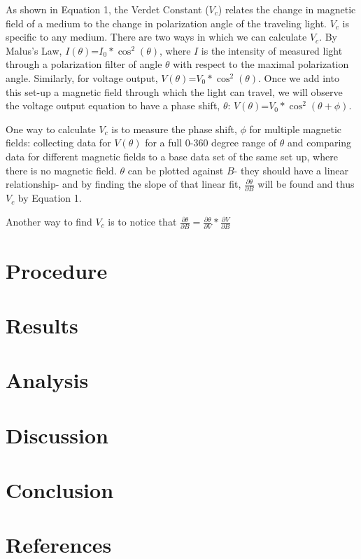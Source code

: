 \documentclass[prb,preprint]{revtex4-1}
\begin{document}
{As shown in Equation 1, the Verdet Constant ($V_{c}$) relates the change in magnetic field of a medium to the change in polarization angle of the traveling light.  $V_{c}$ is specific to any medium.  There are two ways in which we can calculate $V_{c}$.  By Malus's Law, $I(\theta)$=$I_{0}*\cos^{2}(\theta)$, where $I$ is the intensity of measured light through a polarization filter of angle $\theta$ with respect to the maximal polarization angle.  Similarly, for voltage output, $V(\theta)$=$V_{0}*\cos^{2}(\theta)$.  Once we add into this set-up a magnetic field through which the light can travel, we will observe the voltage output equation to have a phase shift, $\theta$:  $V(\theta)$=$V_{0}*\cos^{2}(\theta+\phi)$.}

{One way to calculate $V_{c}$ is to measure the phase shift, $\phi$ for multiple magnetic fields:  collecting data for $V(\theta)$ for a full 0-360 degree range of $\theta$ and comparing data for different magnetic fields to a base data set of the same set up, where there is no magnetic field.  $\theta$ can be plotted against $B$- they should have a linear relationship- and by finding the slope of that linear fit, $\frac{\partial \theta}{\partial B}$ will be found and thus $V_{c}$ by Equation 1.}

{Another way to find $V_{c}$ is to notice that $\frac{\partial \theta}{\partial B}= \frac{\partial \theta}{\partial V}*\frac{\partial V}{\partial B}$}


\section{Procedure}



\section{Results}


\section{Analysis}


\section{Discussion}




\section{Conclusion}


\section{References}
\end{document}
